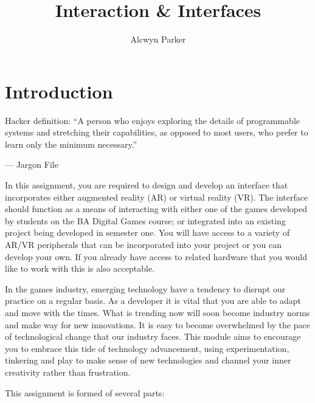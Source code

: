 \documentclass{../fal_assignment}
\title{Interaction \& Interfaces}
\author{Alcwyn Parker}
\begin{document}
\maketitle

\section*{Introduction}

\begin{marginquote}
Hacker definition: ``A person who enjoys exploring the details of programmable systems and stretching their capabilities, as opposed to most users, who prefer to learn only the minimum necessary.''

--- Jargon File

\end{marginquote}

In this assignment, you are required to design and develop an interface that incorporates either augmented reality (AR) or virtual reality (VR). The interface should function as a means of interacting with either one of the games developed by students on the BA Digital Games course; or integrated into an existing project being developed in semester one. You will have access to a variety of AR/VR peripherals that can be incorporated into your project or you can develop your own. If you already have access to related hardware that you would like to work with this is also acceptable. 

In the games industry, emerging technology have a tendency to disrupt our practice on a regular basis. As a developer it is vital that you are able to adapt and move with the times. What is trending now will soon become industry norms and make way for new innovations. It is easy to become overwhelmed by the pace of technological change that our industry faces. This module aims to encourage you to embrace this tide of technology advancement, using experimentation, tinkering and play to make sense of new technologies and channel your inner creativity rather than frustration. 

This assignment is formed of several parts:
\end{document}
